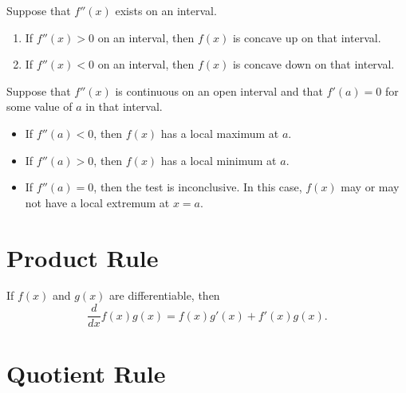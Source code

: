\documentclass{ximera}
\newcommand{\ddx}{\frac{d}{dx}}
\begin{document}
\begin{theorem}
Suppose that $f''(x)$ exists on an interval.
\begin{enumerate}
\item If $f''(x)>0$ on an interval, then $f(x)$ is concave up on that interval.
\item If $f''(x)<0$ on an interval, then $f(x)$ is concave down on that interval.
\end{enumerate}
\end{theorem}



\begin{theorem}\label{T:sdt}
Suppose that $f''(x)$ is continuous on an open interval and that
$f'(a)=0$ for some value of $a$ in that interval.
\begin{itemize}
\item If $f''(a) <0$, then $f(x)$ has a local maximum at $a$.
\item If $f''(a) >0$, then $f(x)$ has a local minimum at $a$.
\item If $f''(a) =0$, then the test is inconclusive. In this case,
$f(x)$ may or may not have a local extremum at $x=a$.
\end{itemize}
\end{theorem}






\section*{Product Rule}





\begin{theorem}\label{theorem:product-rule}
If $f(x)$ and $g(x)$ are differentiable, then
\[
\ddx f(x)g(x) = f(x)g'(x)+f'(x)g(x).
\]
\end{theorem}







\section*{Quotient Rule}
\end{document}
